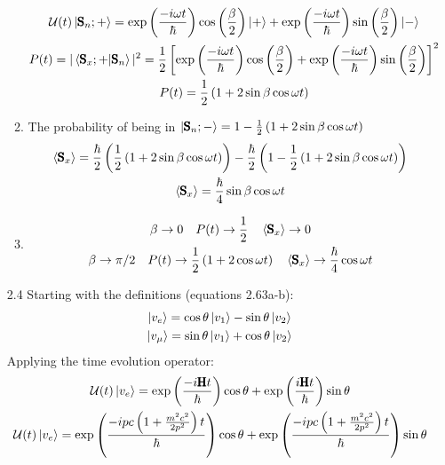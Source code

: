 \documentclass[12pt]{article}
\newcommand{\OP}[1]{\pmb{\text{#1}}}
\newcommand{\Fop}[1]{\mathcal{#1}}
\begin{document}
\begin{enumerate}
\begin{enumerate}
\begin{gather*}
        \Fop{U}(t)\ket{\OP{S}_n;+}=\exp\left( \frac{-i\omega t}{\hbar} \right)\cos\left( \frac{\beta}{2} \right)\ket{+}+\exp\left( \frac{-i\omega t}{\hbar} \right)\sin\left( \frac{\beta}{2} \right)\ket{-}\\
        P(t)=|\braket{\OP{S}_x;+|\OP{S}_n}|^2=\frac{1}{2}\left[ \exp\left( \frac{-i\omega t}{\hbar} \right)\cos\left( \frac{\beta}{2} \right)+\exp\left( \frac{-i\omega t}{\hbar} \right)\sin\left( \frac{\beta}{2} \right) \right]^2\\
        P(t)=\frac{1}{2}\left( 1+2\sin\beta\cos\omega t \right)
      \end{gather*}
      \item The probability of being in $\ket{\OP{S}_n;-}=1-\frac{1}{2}\left( 1+2\sin\beta\cos\omega t \right)$
      \begin{gather*}
        \braket{\OP{S}_x}=\frac{\hbar}{2}\left(\frac{1}{2}\left( 1+2\sin\beta\cos\omega t \right) \right)-\frac{\hbar}{2}\left( 1-\frac{1}{2}\left( 1+2\sin\beta\cos\omega t \right) \right)\\
        \braket{\OP{S}_x}=\frac{\hbar}{4}\sin\beta\cos\omega t
      \end{gather*}
      \item
      \begin{gather*}
        \beta\rightarrow0\quad P(t)\rightarrow \frac{1}{2}\quad \braket{\OP{S}_x}\rightarrow 0\\
        \beta\rightarrow\pi/2\quad P(t)\rightarrow \frac{1}{2}\left( 1+2\cos\omega t \right)\quad \braket{\OP{S}_x}\rightarrow \frac{\hbar}{4}\cos\omega t
      \end{gather*}
    \end{enumerate}
    \item[2.4] Starting with the definitions (equations 2.63a-b):
    \begin{gather*}
      \ket{v_e}=\cos\theta\ket{v_1}-\sin\theta\ket{v_2}\\
      \ket{v_{\mu}}=\sin\theta\ket{v_1}+\cos\theta\ket{v_2}
    \end{gather*}
    Applying the time evolution operator:
    \begin{gather*}
      \Fop{U}(t)\ket{v_e}=\exp\left( \frac{-i\OP{H} t}{\hbar} \right)\cos\theta+\exp\left( \frac{i\OP{H} t}{\hbar} \right)\sin\theta\\
      \Fop{U}(t)\ket{v_e}=\exp\left( \frac{-ipc\left( 1+\frac{m^2 c^2}{2p^2} \right) t}{\hbar} \right)\cos\theta+\exp\left( \frac{-ipc\left( 1+\frac{m^2 c^2}{2p^2} \right) t}{\hbar} \right)\sin\theta\\

\end{gather*}
\end{enumerate}
\end{document}
